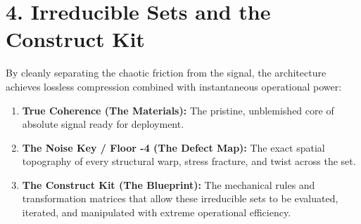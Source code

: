 \medskip

\section{\texorpdfstring{4. Irreducible Sets and the Construct Kit}{4. Irreducible Sets and the Construct Kit}}

By cleanly separating the chaotic friction from the signal, the architecture achieves lossless compression combined with instantaneous operational power:

\begin{enumerate}
\item \textbf{True Coherence (The Materials):} The pristine, unblemished core of absolute signal ready for deployment.
\item \textbf{The Noise Key / Floor -4 (The Defect Map):} The exact spatial topography of every structural warp, stress fracture, and twist across the set.
\item \textbf{The Construct Kit (The Blueprint):} The mechanical rules and transformation matrices that allow these irreducible sets to be evaluated, iterated, and manipulated with extreme operational efficiency.
\end{enumerate}
